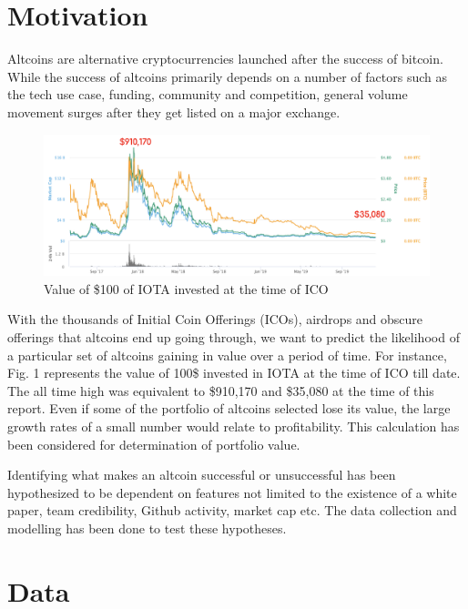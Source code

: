 \documentclass[11pt, english, letterpaper]{article}
\begin{document}
\tableofcontents

\newpage

\section{Motivation}
\justify
Altcoins are alternative cryptocurrencies launched after the success of bitcoin. While the success of altcoins primarily depends on a number of factors such as the tech use case, funding, community and competition, general volume movement surges after they get listed on a major exchange.

\begin{figure}[!h]
    \centering
    \includegraphics[width=\textwidth]{motivation_ICO.png}
    \caption{Value of \$100 of IOTA invested at the time of ICO}
\end{figure}

With the thousands of Initial Coin Offerings (ICOs), airdrops and obscure offerings that altcoins end up going through, we want to predict the likelihood of a particular set of  altcoins gaining in value over a period of time. For instance, Fig. 1 represents the value of 100\$ invested in IOTA at the time of ICO till date. The all time high was equivalent to \$910,170 and \$35,080 at the time of this report. Even if some of the portfolio of altcoins selected lose its value, the large growth rates of a small number would relate to profitability. This calculation has been considered for determination of portfolio value.

Identifying what makes an altcoin successful or unsuccessful has been hypothesized to be dependent on features not limited to the existence of a white paper, team credibility, Github activity, market cap etc. The data collection and modelling has been done to test these hypotheses.

\section{Data}
\end{document}
